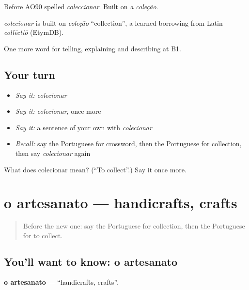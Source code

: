 Before AO90 spelled \emph{coleccionar}. Built on \emph{a coleção}.

\begin{cousinweb}
\emph{colecionar} is built on \emph{coleção} \textquotedblleft{}collection\textquotedblright{}, a learned borrowing from Latin \emph{collēctiō} (EtymDB).
\end{cousinweb}

\begin{grammarlens}[title={What you've built}]
One more word for telling, explaining and describing at B1.
\end{grammarlens}

\subsection*{Your turn}
\begin{itemize}
\raggedright
  \item \emph{Say it:} \emph{colecionar}
  \item \emph{Say it:} \emph{colecionar}, once more
  \item \emph{Say it:} a sentence of your own with \emph{colecionar}
  \item \emph{Recall:} say the Portuguese for crossword, then the Portuguese for collection, then say \emph{colecionar} again
\end{itemize}

\begin{tcolorbox}[breakable,colback=teal!4,colframe=teal!35!black,title={Before you move on}]
What does colecionar mean? (\textquotedblleft{}To collect\textquotedblright{}.) Say it once more.
\end{tcolorbox}
\section[o artesanato]{o artesanato — handicrafts, crafts}

\label{lesson:PT-C504-artesanato}



\begin{quote}
Before the new one: say the Portuguese for collection, then the Portuguese for to collect.
\end{quote}

\subsection*{You'll want to know: o artesanato}
\textbf{o artesanato} — \textquotedblleft{}handicrafts, crafts\textquotedblright{}.

